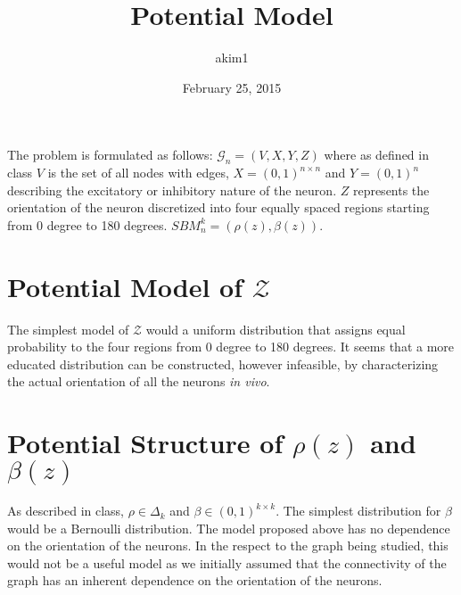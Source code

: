 \documentclass{article}
\title{Potential Model}
\author{akim1}
\date{February 25, 2015}
\begin{document}
\maketitle

The problem is formulated as follows: $\mathscr{G}_n=(V,X,Y,Z)$ where as defined
in class $V$ is the set of all nodes with edges, $X=(0,1)^{n\times n}$ and
$Y=(0,1)^n$ describing the excitatory or inhibitory nature of the neuron. $Z$
represents the orientation of the neuron discretized into four equally spaced
regions starting from 0 degree to 180 degrees.
$\mathit{SBM}_n^k=(\rho(z),\beta(z))$.

\section{Potential Model of $\mathscr{Z}$}
The simplest model of $\mathscr{Z}$ would a uniform distribution that assigns
equal probability to the four regions from 0 degree to 180 degrees. It seems
that a more educated distribution can be constructed, however infeasible, by
characterizing the actual orientation of all the neurons \textit{in vivo}.

\section{Potential Structure of $\rho(z)$ and $\beta(z)$}
As described in class, $\rho\in\Delta_k$ and $\beta\in(0,1)^{k\times k}$. The
simplest distribution for $\beta$ would be a Bernoulli distribution. The model
proposed above has no dependence on the orientation of the neurons. In the
respect to the graph being studied, this would not be a useful model as we
initially assumed that the connectivity of the graph has an inherent dependence
on the orientation of the neurons.
\end{document}
